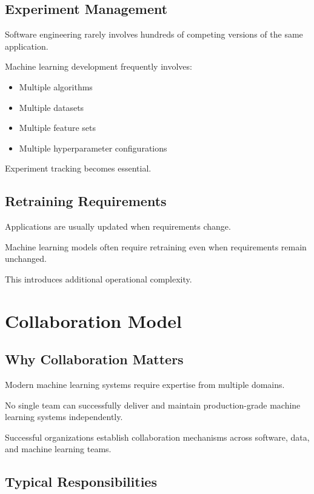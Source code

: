 \subsection{Experiment Management}

Software engineering rarely involves hundreds of competing versions of the same application.

Machine learning development frequently involves:

\begin{itemize}
    \item Multiple algorithms
    \item Multiple datasets
    \item Multiple feature sets
    \item Multiple hyperparameter configurations
\end{itemize}

Experiment tracking becomes essential.

\subsection{Retraining Requirements}

Applications are usually updated when requirements change.

Machine learning models often require retraining even when requirements remain unchanged.

This introduces additional operational complexity.

\section{Collaboration Model}

\subsection{Why Collaboration Matters}

Modern machine learning systems require expertise from multiple domains.

No single team can successfully deliver and maintain production-grade machine learning systems independently.

Successful organizations establish collaboration mechanisms across software, data, and machine learning teams.

\subsection{Typical Responsibilities}


